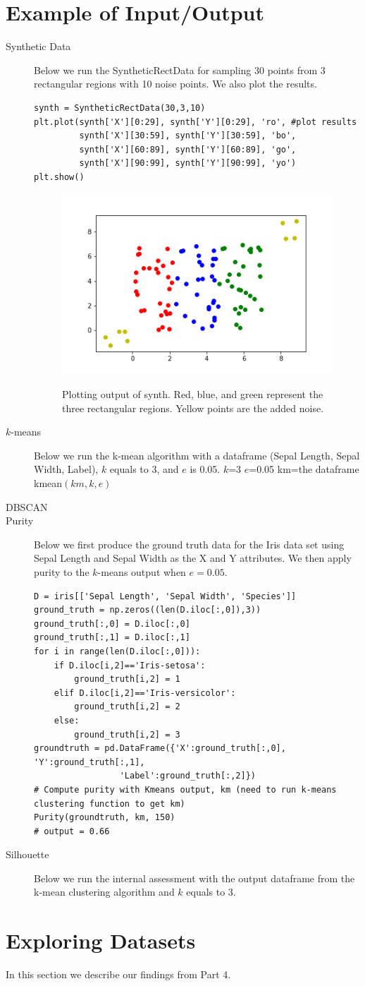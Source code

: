 \documentclass[psamsfonts,onesided,10pt]{amsart}
\begin{document}
\section{Example of Input/Output}
\begin{description}
\item[Synthetic Data] Below we run the SyntheticRectData for sampling 30 points from 3 
rectangular regions with 10 noise points. We also plot the results.
\begin{verbatim}
synth = SyntheticRectData(30,3,10)
plt.plot(synth['X'][0:29], synth['Y'][0:29], 'ro', #plot results
         synth['X'][30:59], synth['Y'][30:59], 'bo', 
         synth['X'][60:89], synth['Y'][60:89], 'go',
         synth['X'][90:99], synth['Y'][90:99], 'yo')
plt.show()   
\end{verbatim}
\begin{figure}[H]
    \centering
    {\includegraphics[width=.4\textwidth]{images/synth.png}} \\
    \caption{Plotting output of synth. Red, blue, and green represent the three rectangular regions. 
Yellow points are the added noise.}
\end{figure}
\item[$k$-means] Below we run the k-mean algorithm with a dataframe (Sepal Length, Sepal Width, Label), $k$ equals to 3, and $e$ is 0.05. 
$k$=3
$e$=0.05
km=the dataframe
kmean$(km,k,e)$
\todo{}
\item[DBSCAN] \todo{}
\item[Purity] Below we first produce the ground truth data for the Iris data set using Sepal Length 
and Sepal Width as the X and Y attributes. We then apply purity to the $k$-means output when $e=0.05$. 
\begin{verbatim}
D = iris[['Sepal Length', 'Sepal Width', 'Species']]
ground_truth = np.zeros((len(D.iloc[:,0]),3))
ground_truth[:,0] = D.iloc[:,0]
ground_truth[:,1] = D.iloc[:,1]
for i in range(len(D.iloc[:,0])):
    if D.iloc[i,2]=='Iris-setosa':
        ground_truth[i,2] = 1
    elif D.iloc[i,2]=='Iris-versicolor':
        ground_truth[i,2] = 2
    else:
        ground_truth[i,2] = 3
groundtruth = pd.DataFrame({'X':ground_truth[:,0], 'Y':ground_truth[:,1], 
                 'Label':ground_truth[:,2]})       
# Compute purity with Kmeans output, km (need to run k-means clustering function to get km)
Purity(groundtruth, km, 150)
# output = 0.66
\end{verbatim}
\item[Silhouette] Below we run the internal assessment with the output dataframe from the k-mean clustering algorithm and $k$ equals to 3. \todo{}
\end{description}

\section{Exploring Datasets}
In this section we describe our findings from Part 4. \todo{}
\end{document}
